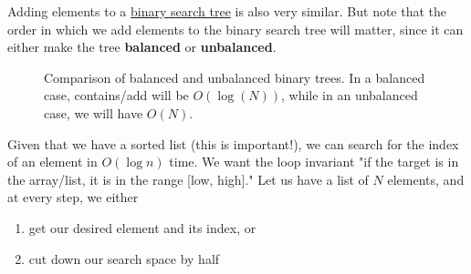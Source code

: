   Adding elements to a \hyperref[def:binary-search-tree]{binary search tree} is also very similar. But note that the order in which we add elements to the binary search tree will matter, since it can either make the tree \textbf{balanced} or \textbf{unbalanced}. 

  \begin{figure}[H]
    \centering 
    \caption{Comparison of balanced and unbalanced binary trees. In a balanced case, contains/add will be $O(\log(N))$, while in an unbalanced case, we will have $O(N)$.}
    \label{fig:trees}
  \end{figure}

  \begin{definition}
    \label{def:binary-search}
    Given that we have a sorted list (this is important!), we can search for the index of an element in $O(\log{n})$ time. We want the loop invariant "if the target is in the array/list, it is in the range [low, high]." Let us have a list of $N$ elements, and at every step, we either 
    \begin{enumerate}
      \item get our desired element and its index, or 
      \item cut down our search space by half
    \end{enumerate}
  \end{definition}

